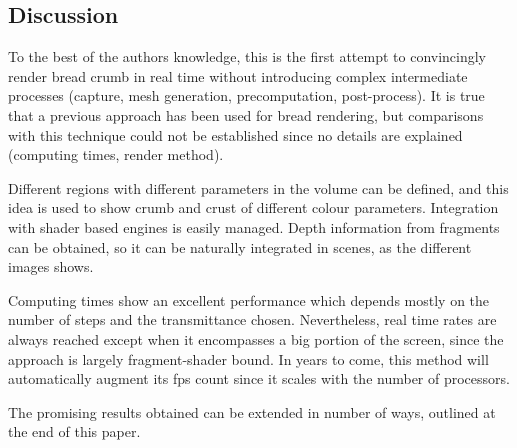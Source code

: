 \documentclass[oneside,a4paper,english,links]{amca}
\begin{document}
\subsection{Discussion}
To the best of the authors knowledge, this is the first attempt to convincingly render bread crumb in real time without introducing complex intermediate processes (capture, mesh generation, precomputation, post-process). It is true that a previous approach \citep{Cho2007} has been used for bread rendering, but comparisons with this technique could not be established since no details are explained (computing times, render method).

Different regions with different parameters in the volume can be
defined, and this idea is used to show crumb and crust of different
colour parameters. 
Integration with shader based engines is easily managed. Depth
information from fragments can be obtained, so it can be naturally
integrated in scenes, as the different images shows.

Computing times show an excellent performance which depends mostly on
the number of steps and the transmittance chosen. Nevertheless, real
time rates are always reached except when it encompasses a big portion
of the screen, since the approach is largely fragment-shader bound. In
years to come, this method will automatically augment its fps count
since it scales with the number of processors.

The promising results obtained can be extended in number of ways,
outlined at the end of this paper.






\end{document}
